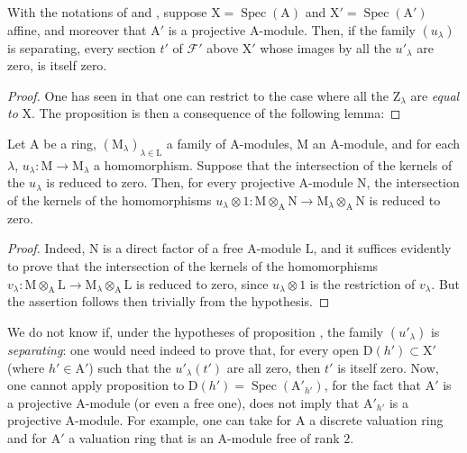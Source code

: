 \begin{proposition}[11.9.7]
\label{IV.11.9.7}
With the notations of  and , suppose $\mathrm{X}=\operatorname{Spec}(\mathrm{A})$ and $\mathrm{X}'=\operatorname{Spec}(\mathrm{A}')$ affine, and moreover that $\mathrm{A}'$ is a projective $\mathrm{A}$-module.
Then, if the family $(u_\lambda)$ is separating, every section $t'$ of $\mathscr{F}'$ above $\mathrm{X}'$ whose images by all the $u'_\lambda$ are zero, is itself zero.
\end{proposition}

\begin{proof}
One has seen in  that one can restrict to the case where all the $\mathrm{Z}_\lambda$ are \emph{equal to} $\mathrm{X}$.
The proposition is then a consequence of the following lemma:
\end{proof}

\begin{lemma}[11.9.7.1]
\label{IV.11.9.7.1}
Let $\mathrm{A}$ be a ring, $(\mathrm{M}_\lambda)_{\lambda\in\mathrm{L}}$ a family of $\mathrm{A}$-modules, $\mathrm{M}$ an $\mathrm{A}$-module, and for each $\lambda$, $u_\lambda:\mathrm{M}\to\mathrm{M}_\lambda$ a homomorphism.
Suppose that the intersection of the kernels of the $u_\lambda$ is reduced to zero.
Then, for every projective $\mathrm{A}$-module $\mathrm{N}$, the intersection of the kernels of the homomorphisms $u_\lambda\otimes 1:\mathrm{M}\otimes_\mathrm{A}\mathrm{N}\to\mathrm{M}_\lambda\otimes_\mathrm{A}\mathrm{N}$ is reduced to zero.
\end{lemma}

\begin{proof}
Indeed, $\mathrm{N}$ is a direct factor of a free $\mathrm{A}$-module $\mathrm{L}$, and it suffices evidently to prove that the intersection of the kernels of the homomorphisms $v_\lambda:\mathrm{M}\otimes_\mathrm{A}\mathrm{L}\to\mathrm{M}_\lambda\otimes_\mathrm{A}\mathrm{L}$ is reduced to zero, since $u_\lambda\otimes 1$ is the restriction of $v_\lambda$.
But the assertion follows then trivially from the hypothesis.
\end{proof}

\begin{remarks}[11.9.8]
\label{IV.11.9.8}
We do not know if, under the hypotheses of proposition , the family $(u'_\lambda)$ is \emph{separating}: one would need indeed to prove  that, for every open $\mathrm{D}(h')\subset\mathrm{X}'$ (where $h'\in\mathrm{A}'$) such that the $u'_\lambda(t')$ are all zero, then $t'$ is itself zero.
Now, one cannot apply proposition  to $\mathrm{D}(h')=\operatorname{Spec}(\mathrm{A}'_{h'})$, for the fact that $\mathrm{A}'$ is a projective $\mathrm{A}$-module (or even a free one), does not imply that $\mathrm{A}'_{h'}$ is a projective $\mathrm{A}$-module.
For example, one can take for $\mathrm{A}$ a discrete valuation ring and for $\mathrm{A}'$ a valuation ring that is an $\mathrm{A}$-module free of rank $2$.
\end{remarks}

